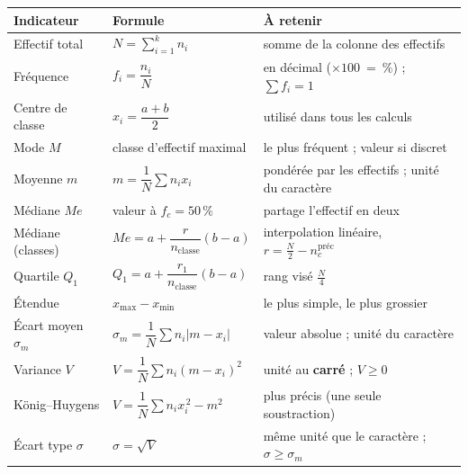 \documentclass[11pt,a4paper]{article}
\newcommand{\ecm}{\sigma_m}              %
\newcommand{\ect}{\sigma}                %
\newcommand{\med}{M\!e}                  %
\begin{document}
\begin{center}
\renewcommand{\arraystretch}{1.55}
\begin{tabular}{>{\raggedright\arraybackslash}p{3.7cm} >{\centering\arraybackslash}p{5.6cm} >{\raggedright\arraybackslash}p{5.0cm}}
\rowcolor{primary!18}
\textbf{Indicateur} & \textbf{Formule} & \textbf{À retenir} \\
\midrule
Effectif total & $N=\displaystyle\sum_{i=1}^{k} n_i$ & somme de la colonne des effectifs \\
Fréquence & $f_i=\dfrac{n_i}{N}$ & en décimal ($\times 100\,$ = \,\%) ; $\sum f_i=1$ \\
Centre de classe & $x_i=\dfrac{a+b}{2}$ & utilisé dans tous les calculs \\
Mode $M$ & classe d'effectif maximal & le plus fréquent ; valeur si discret \\
Moyenne $m$ & $m=\dfrac{1}{N}\sum n_i x_i$ & pondérée par les effectifs ; unité du caractère \\
Médiane $\med$ & valeur à $f_c=50\,\%$ & partage l'effectif en deux \\
Médiane (classes) & $\med=a+\dfrac{r}{n_{\text{classe}}}(b-a)$ & interpolation linéaire, $r=\tfrac{N}{2}-n_c^{\text{préc}}$ \\
Quartile $Q_1$ & $Q_1=a+\dfrac{r_1}{n_{\text{classe}}}(b-a)$ & rang visé $\tfrac{N}{4}$ \\
Étendue & $x_{\max}-x_{\min}$ & le plus simple, le plus grossier \\
Écart moyen $\ecm$ & $\ecm=\dfrac{1}{N}\sum n_i|m-x_i|$ & valeur absolue ; unité du caractère \\
Variance $V$ & $V=\dfrac{1}{N}\sum n_i(m-x_i)^2$ & unité au \textbf{carré} ; $V\geqslant 0$ \\
König--Huygens & $V=\dfrac{1}{N}\sum n_i x_i^{\,2}-m^2$ & plus précis (une seule soustraction) \\
Écart type $\ect$ & $\ect=\sqrt{V}$ & même unité que le caractère ; $\ect\geqslant\ecm$ \\
\bottomrule
\end{tabular}
\end{center}
\end{document}
